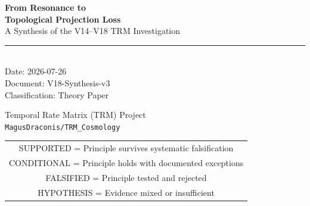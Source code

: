 \documentclass[11pt,a4paper,oneside]{report}
\newcommand{\supported}{\textcolor{supported}{SUPPORTED}}
\newcommand{\conditional}{\textcolor{conditional}{CONDITIONAL}}
\newcommand{\falsified}{\textcolor{falsified}{FALSIFIED}}
\newcommand{\chypothesis}{\textcolor{hypothesis}{HYPOTHESIS}}
\begin{document}
\begin{titlepage}
\thispagestyle{empty}

\vspace*{3cm}

\begin{center}
  {\Huge\bfseries From Resonance to\\[8pt] Topological Projection Loss}\\[16pt]
  {\LARGE A Synthesis of the V14--V18 TRM Investigation}\\[24pt]

  \rule{0.7\textwidth}{0.5pt}\\[24pt]

  {\large
  Date: 2026-07-26\\[8pt]
  Document: V18-Synthesis-v3\\[8pt]
  Classification: Theory Paper
  }

  \vspace{2cm}

  {\normalsize
  Temporal Rate Matrix (TRM) Project\\
  \texttt{MagusDraconis/TRM\_Cosmology}
  }

  \vfill

  {\small
  \begin{tabular}{c}
    \supported{} = Principle survives systematic falsification\\
    \conditional{} = Principle holds with documented exceptions\\
    \falsified{} = Principle tested and rejected\\
    \chypothesis{} = Evidence mixed or insufficient
  \end{tabular}
  }
\end{center}
\end{titlepage}

\tableofcontents
\newpage
\end{document}
